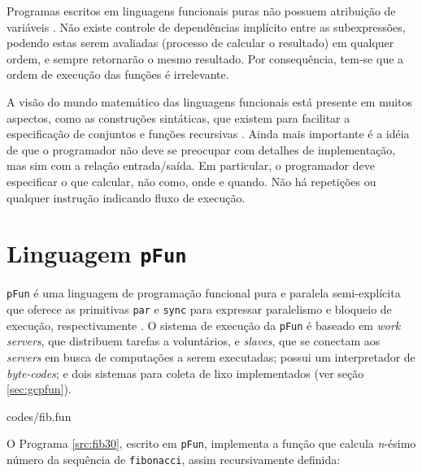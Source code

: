 \documentclass[ccc, pg2]{esinucpel}
\begin{document}

Programas escritos em linguagens funcionais puras não possuem atribuição de variáveis \cite{bib:hughes84}. Não existe controle de dependências implícito entre as subexpressões, podendo estas serem avaliadas (processo de calcular o resultado) em qualquer ordem, e sempre retornarão o mesmo resultado. Por consequência, tem-se que a ordem de execução das funções é irrelevante.%

A visão do mundo matemático das linguagens funcionais está presente em muitos aspectos, como as construções sintáticas, que existem para facilitar a especificação de conjuntos e funções recursivas \cite{bib:grune}. Ainda mais importante é a idéia de que o programador não deve se preocupar com detalhes de implementação, mas sim com a relação entrada/saída. Em particular, o programador deve especificar o que calcular, não como, onde e quando. Não há repetições ou qualquer instrução indicando fluxo de execução.


\section{Linguagem \texttt{pFun}}
\texttt{pFun} é uma linguagem de programação funcional pura e paralela semi-explícita
 que oferece as primitivas \texttt{par} e \texttt{sync} para expressar paralelismo e bloqueio de execução, respectivamente \cite{bib:dubois:pfun}. O sistema de execução da \texttt{pFun} é baseado em \textit{work servers}, que distribuem tarefas a voluntários, e \textit{slaves}, que se conectam aos \textit{servers} em busca de computações a serem executadas; possui um interpretador de \textit{byte-codes}; e dois sistemas para coleta de lixo implementados (ver seção \ref{sec:gcpfun}).


								 {codes/fib.fun}

O Programa \ref{src:fib30}, escrito em \texttt{pFun}, implementa a função que calcula \textit{n}-ésimo número da sequência de \texttt{fibonacci}, assim recursivamente definida:
\end{document}
